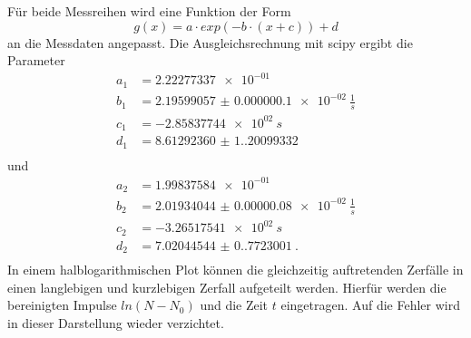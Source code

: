 Für beide Messreihen wird eine Funktion der Form
\begin{equation*}
  g(x) = a\cdot exp(-b\cdot(x+c)) + d
\end{equation*}
an die Messdaten angepasst. Die Ausgleichsrechnung mit scipy \cite{scipy} ergibt die Parameter
\begin{align*}
  a_1 &= \SI{2.22277337e-01}{}\\
  b_1 &= \SI{2.19599057(0.1)e-02}{\frac{1}{s}}\\
  c_1 &= \SI{-2.85837744e+02}{s}\\
  d_1 &= \SI{8.61292360(1.20099332)}{}\\
\end{align*}
und 
\begin{align*}
  a_2 &= \SI{1.99837584e-01}{}\\
  b_2 &= \SI{2.01934044(0.08)e-02}{\frac{1}{s}}\\
  c_2 &= \SI{-3.26517541e+02}{s}\\
  d_2 &= \SI{7.02044544(0.7723001)}{}.\\
\end{align*}
In einem halblogarithmischen Plot können die gleichzeitig auftretenden Zerfälle in einen langlebigen und kurzlebigen Zerfall aufgeteilt werden.
Hierfür werden die bereinigten Impulse $ln(N-N_0)$ und die Zeit $t$ eingetragen. Auf die Fehler wird in dieser Darstellung wieder verzichtet.
